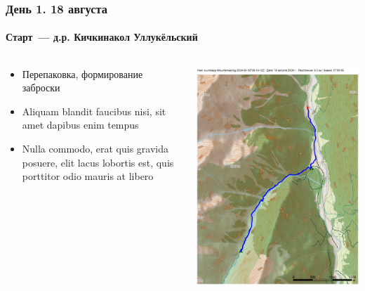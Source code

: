 \documentclass[
11pt, %
]{beamer}
\begin{document}
	\begin{frame}
		\frametitle{День 1. 18 августа}
		\framesubtitle{Старт~--- д.р. Кичкинакол Уллукёльский} %
			\begin{columns}[c] %
			\begin{column}{0.45\textwidth} %
				\begin{itemize}
					\item Перепаковка, формирование заброски
					\item Aliquam blandit faucibus nisi, sit amet dapibus enim tempus
					\item Nulla commodo, erat quis gravida posuere, elit lacus lobortis est, quis porttitor odio mauris at libero
				\end{itemize}

			\end{column}
			\begin{column}{0.5\textwidth} %
				\centering
				\includegraphics[width=\linewidth]{../pics/mini_maps/18}
			\end{column}
		\end{columns}
	\end{frame}
	
\end{document}
